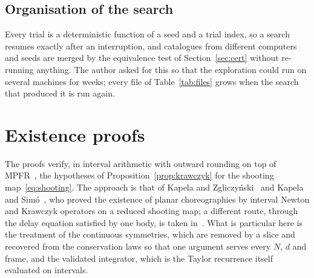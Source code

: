 \documentclass[11pt]{amsart}
\theoremstyle{definition}
\begin{document}
\subsection{Organisation of the search}\label{sec:organisation}
Every trial is a deterministic function of a seed and a trial index, so a search resumes exactly after an interruption, and catalogues from different computers and seeds are merged by the equivalence test of Section~\ref{sec:cert} without re-running anything. The author asked for this so that the exploration could run on several machines for weeks; every file of Table~\ref{tab:files} grows when the search that produced it is run again.

\section{Existence proofs}\label{sec:proofs}

The proofs verify, in interval arithmetic with outward rounding on top of MPFR~\cite{MPFR2007}, the hypotheses of Proposition~\ref{prop:krawczyk} for the shooting map~\eqref{eq:shooting}. The approach is that of Kapela and Zgliczy\'nski~\cite{KapelaZgliczynski2003} and Kapela and Sim\'o~\cite{KapelaSimo2007}, who proved the existence of planar choreographies by interval Newton and Krawczyk operators on a reduced shooting map; a different route, through the delay equation satisfied by one body, is taken in~\cite{CGLM2021}. What is particular here is the treatment of the continuous symmetries, which are removed by a slice and recovered from the conservation laws so that one argument serves every $N$, $d$ and frame, and the validated integrator, which is the Taylor recurrence itself evaluated on intervals.
\end{document}
